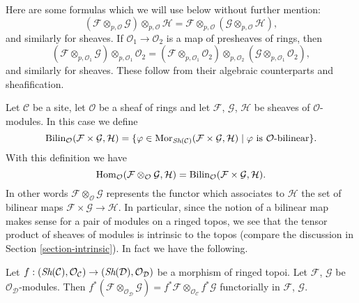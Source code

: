 \medskip\noindent
Here are some formulas which we will use below without further mention:
$$
(\mathcal{F}
\otimes_{p, \mathcal{O}} \mathcal{G})
\otimes_{p, \mathcal{O}} \mathcal{H}
=
\mathcal{F}
\otimes_{p, \mathcal{O}} (\mathcal{G}
\otimes_{p, \mathcal{O}} \mathcal{H}),
$$
and similarly for sheaves.
If $\mathcal{O}_1 \to \mathcal{O}_2$ is a map of presheaves of rings,
then
$$
(\mathcal{F} \otimes_{p, \mathcal{O}_1} \mathcal{G})
\otimes_{p, \mathcal{O}_1} \mathcal{O}_2 =
(\mathcal{F} \otimes_{p, \mathcal{O}_1} \mathcal{O}_2)
\otimes_{p, \mathcal{O}_2}
(\mathcal{G} \otimes_{p, \mathcal{O}_1} \mathcal{O}_2),
$$
and similarly for sheaves.
These follow from their algebraic counterparts and sheafification.

\medskip\noindent
Let $\mathcal{C}$ be a site, let $\mathcal{O}$ be a sheaf of rings and let
$\mathcal{F}$, $\mathcal{G}$, $\mathcal{H}$ be sheaves of
$\mathcal{O}$-modules. In this case we define
$$
\text{Bilin}_\mathcal{O}(\mathcal{F} \times \mathcal{G}, \mathcal{H})
=
\{\varphi \in
\mathop{\rm Mor}\nolimits_{\mathop{\textit{Sh}}\nolimits(\mathcal{C})}(
\mathcal{F} \times \mathcal{G}, \mathcal{H}) \mid
\varphi \text{ is }\mathcal{O}\text{-bilinear}\}.
$$
With this definition we have
$$
\mathop{\rm Hom}\nolimits_\mathcal{O}
(\mathcal{F} \otimes_\mathcal{O} \mathcal{G}, \mathcal{H})
=
\text{Bilin}_\mathcal{O}(\mathcal{F} \times \mathcal{G}, \mathcal{H}).
$$
In other words $\mathcal{F} \otimes_\mathcal{O} \mathcal{G}$
represents the functor which associates to $\mathcal{H}$ the set
of bilinear maps $\mathcal{F} \times \mathcal{G} \to \mathcal{H}$.
In particular, since the notion of a bilinear map makes sense for
a pair of modules on a ringed topos, we see that the tensor
product of sheaves of modules is intrinsic to the topos (compare
the discussion in Section \ref{section-intrinsic}). In fact we
have the following.

\begin{lemma}
\label{lemma-tensor-product-pullback}
Let $f : (\mathop{\textit{Sh}}\nolimits(\mathcal{C}), \mathcal{O}_\mathcal{C})
\to (\mathop{\textit{Sh}}\nolimits(\mathcal{D}), \mathcal{O}_\mathcal{D})$ be
a morphism of ringed topoi. Let $\mathcal{F}$, $\mathcal{G}$
be $\mathcal{O}_\mathcal{D}$-modules. Then
$f^*(\mathcal{F} \otimes_{\mathcal{O}_\mathcal{D}} \mathcal{G})
= f^*\mathcal{F} \otimes_{\mathcal{O}_\mathcal{C}} f^*\mathcal{G}$
functorially in $\mathcal{F}$, $\mathcal{G}$.
\end{lemma}

